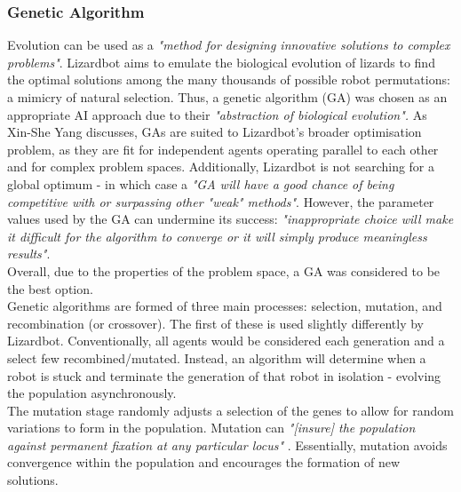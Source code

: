 \documentclass{article}
\begin{document}
\subsubsection{Genetic Algorithm}
Evolution can be used as a \textit{"method for designing innovative solutions to complex problems"}.  Lizardbot aims to emulate the biological evolution of lizards to find the optimal solutions among the many thousands of possible robot permutations: a mimicry of natural selection.
Thus, a genetic algorithm (GA) was chosen as an appropriate AI approach due to their \textit{"abstraction of biological evolution".} As Xin-She Yang discusses, GAs are suited to Lizardbot's broader optimisation problem, as they are fit for independent agents operating parallel to each other and for complex problem spaces.  Additionally, Lizardbot is not searching for a global optimum - in which case a \textit{"GA will have a good chance of being competitive with or surpassing other "weak" methods"}.  However, the parameter values used by the GA can undermine its success: \textit{"inappropriate choice will make it difficult for the algorithm to converge or it will simply produce meaningless results"}.
 \\
Overall, due to the properties of the problem space, a GA was considered to be the best option.\\

Genetic algorithms are formed of three main processes: selection, mutation, and recombination (or crossover).  The first of these is used slightly differently by Lizardbot. Conventionally, all agents would be considered each generation and a select few recombined/mutated. Instead, an algorithm will determine when a robot is stuck and terminate the generation of that robot in isolation - evolving the population asynchronously. \\

The mutation stage randomly adjusts a selection of the genes to allow for random variations to form in the population. Mutation can \textit{"[insure]
the population against permanent fixation at any particular locus"} . Essentially, mutation avoids convergence within the population and encourages the formation of new solutions. 
\end{document}
